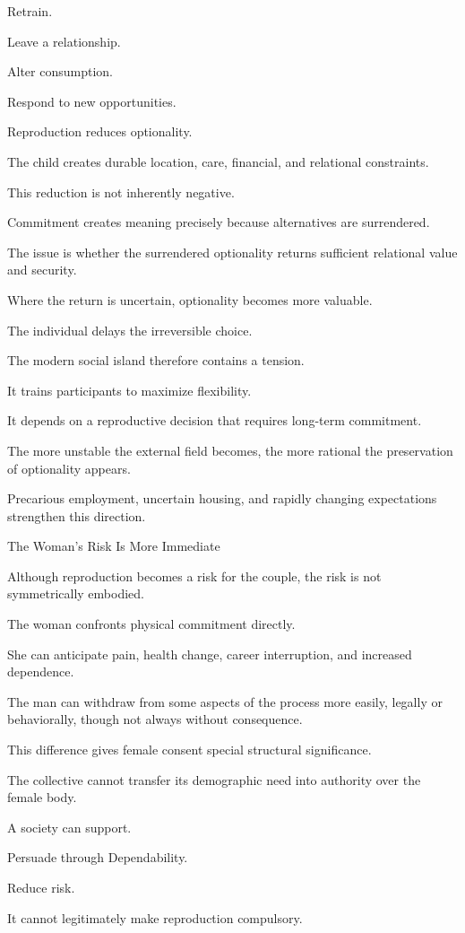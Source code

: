 Retrain.

Leave a relationship.

Alter consumption.

Respond to new opportunities.

Reproduction reduces optionality.

The child creates durable location, care, financial, and relational constraints.

This reduction is not inherently negative.

Commitment creates meaning precisely because alternatives are surrendered.

The issue is whether the surrendered optionality returns sufficient relational value and security.

Where the return is uncertain, optionality becomes more valuable.

The individual delays the irreversible choice.

The modern social island therefore contains a tension.

It trains participants to maximize flexibility.

It depends on a reproductive decision that requires long-term commitment.

The more unstable the external field becomes, the more rational the preservation of optionality appears.

Precarious employment, uncertain housing, and rapidly changing expectations strengthen this direction.

The Woman’s Risk Is More Immediate

Although reproduction becomes a risk for the couple, the risk is not symmetrically embodied.

The woman confronts physical commitment directly.

She can anticipate pain, health change, career interruption, and increased dependence.

The man can withdraw from some aspects of the process more easily, legally or behaviorally, though not always without consequence.

This difference gives female consent special structural significance.

The collective cannot transfer its demographic need into authority over the female body.

A society can support.

Persuade through Dependability.

Reduce risk.

It cannot legitimately make reproduction compulsory.

